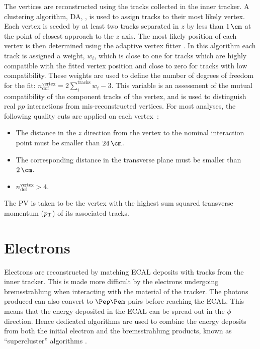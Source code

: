 The vertices are reconstructed using the tracks collected in the inner
tracker. A clustering algorithm, \ac{DA},
\cite{DetAnnealing}, is used to assign tracks to their most likely 
vertex. Each vertex is seeded by at least two tracks separated in $z$ by less than
$1\,\cm$ at the point of closest approach to the $z$ axis.
The most likely position of each vertex is then determined using the
adaptive vertex fitter \cite{adaptivevertex}. In
this algorithm each track is assigned a weight, $w_{i}$, which is close to one for tracks which
are highly compatible with the fitted vertex position and close to zero for tracks with low
compatibility. These weights are used to define the number of degrees of freedom
for the fit: $n_{\text{dof}}^{\text{vertex}} = 2\sum_{i}^{\text{tracks}}w_{i}-3$. This
variable is an assessment of the mutual compatibility of the component tracks of
the vertex, and is used to distinguish real $pp$ interactions from
mis-reconstructed vertices. For most analyses, the following quality cuts are
applied on each vertex~\cite{CMS-PAS-TRK-10-005}:
\begin{itemize}
\item The distance in the $z$ direction from the vertex to the nominal interaction
point must be smaller than $24\,\cm$. 
\item The corresponding distance in the transverse plane must be smaller than
$2\,\cm$.
\item $n_{\text{dof}}^{\text{vertex}} > 4$.
\end{itemize}

The \ac{PV} is taken to be the vertex with the highest sum squared transverse
momentum ($p_{\mathrm{T}}$) of its associated tracks. 

\section{Electrons}
\label{sec:electrons}

Electrons are reconstructed by matching \ac{ECAL} deposits with tracks from the
inner tracker. This is made more difficult by the electrons
undergoing bremsstrahlung when interacting with the material of the tracker.
The photons produced can also convert to $\Pep\Pem$ pairs before
reaching the \ac{ECAL}. This means that the energy deposited in the \ac{ECAL} 
can be spread out in the $\phi$ direction. Hence dedicated algorithms are used
to combine the energy deposits from both the initial electron and the
bremsstrahlung products, known as ``supercluster'' algorithms \cite{ElectronReco}.

